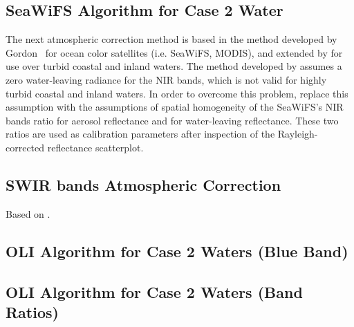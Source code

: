 \subsection{SeaWiFS Algorithm for Case 2 Water}
The next atmospheric correction method is based in the method developed by Gordon~\cite{Gordon:1997} for ocean color satellites (i.e. SeaWiFS, MODIS), and extended by \cite{Ruddick:2000bs} for use over turbid coastal and inland waters. The method developed by \cite{Gordon:1994} assumes a zero water-leaving radiance for the NIR bands, which is not valid for highly turbid coastal and inland waters. In order to overcome this problem, \cite{Ruddick:2000bs} replace this assumption with the assumptions of spatial homogeneity of the SeaWiFS's NIR bands ratio for aerosol reflectance and for water-leaving reflectance. These two ratios are used as calibration parameters after inspection of the Rayleigh-corrected reflectance scatterplot.

\subsection{SWIR bands Atmospheric Correction}
Based on \cite{Wang:2007}.

\subsection{OLI Algorithm for Case 2 Waters (Blue Band)}

\subsection{OLI Algorithm for Case 2 Waters (Band Ratios)}
